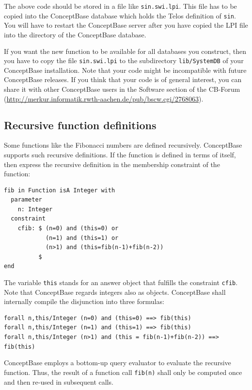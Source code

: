 The above code should be stored in a file like {\tt sin.swi.lpi}. This file has to be
copied into the ConceptBase database which holds the Telos definition of {\tt sin}.
You will have to restart the ConceptBase server after you have copied the LPI file into the
directory of the ConceptBase database.

If you want the new function to be available for all databases you construct, then you
have to copy the file  {\tt sin.swi.lpi} to the subdirectory {\tt lib/SystemDB} of your ConceptBase installation.
Note that your code might be incompatible with future ConceptBase releases. If you think that your code is
of general interest, you can share it with other ConceptBase users in the Software section
of the CB-Forum
(\url{http://merkur.informatik.rwth-aachen.de/pub/bscw.cgi/2768063}).


\subsection{Recursive function definitions}

Some functions like the Fibonacci numbers are defined recursively. ConceptBase supports
such recursive definitions. If the function is defined in terms of itself, then 
express the recursive definition in the membership constraint of the function:

{\small
\begin{verbatim}
fib in Function isA Integer with
  parameter
    n: Integer
  constraint
    cfib: $ (n=0) and (this=0) or
            (n=1) and (this=1) or
            (n>1) and (this=fib(n-1)+fib(n-2))
          $
end
\end{verbatim}
}

The variable {\tt this} stands for an answer object that fulfills the constraint {\tt cfib}.
Note that ConceptBase regards integers also as objects.
ConceptBase shall internally compile the disjunction into three formulas:

{\small
\begin{verbatim}
forall n,this/Integer (n=0) and (this=0) ==> fib(this)
forall n,this/Integer (n=1) and (this=1) ==> fib(this)
forall n,this/Integer (n>1) and (this = fib(n-1)+fib(n-2)) ==> fib(this)
\end{verbatim}
}

ConceptBase employs a bottom-up query evaluator to evaluate the recursive function.
Thus, the result of a function call {\tt fib(n)} shall only be computed once and then
re-used in subsequent calls.

